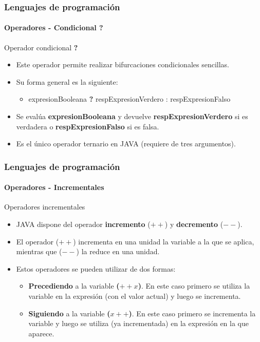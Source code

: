 \documentclass{beamer}
\begin{document}
		\begin{frame}
			\frametitle{Lenguajes de programaci\'on} 
			\framesubtitle{Operadores - Condicional \textbf{?}}

			\begin{block}{Operador condicional \textbf{?}}
				\begin{itemize}
					\item Este operador permite realizar bifurcaciones condicionales sencillas.
					\item Su forma general es la siguiente:
					\begin{itemize}
						\item expresionBooleana \textbf{?} respExpresionVerdero : respExpresionFalso
					\end{itemize}
					\item Se eval\'ua \textbf{expresionBooleana} y devuelve \textbf{respExpresionVerdero} si es verdadera o \textbf{respExpresionFalso} si es falsa.
					\item Es el \'unico operador ternario en JAVA (requiere de tres argumentos).
				\end{itemize}
			\end{block}
		\end{frame}

		\begin{frame}
			\frametitle{Lenguajes de programaci\'on} 
			\framesubtitle{Operadores - Incrementales}

			\begin{block}{Operadores incrementales}
				\begin{itemize}
					\item JAVA dispone del operador \textbf{incremento} ($++$) y \textbf{decremento} ($- -$).
					\item El operador ($++$) incrementa en una unidad la variable a la que se aplica, mientras que ($- -$) la reduce en una unidad.
					\item Estos operadores se pueden utilizar de dos formas:
					\begin{itemize}
						\item \textbf{Precediendo}  a la variable \textbf{($++x$)}. En este caso primero se utiliza la variable en la expresi\'on (con el valor actual) y luego se incrementa.
						\item \textbf{Siguiendo} a la variable \textbf{($x++$)}. En este caso primero se incrementa la variable y luego se utiliza (ya incrementada) en la expresi\'on en la que aparece.
					\end{itemize}
				\end{itemize}
			\end{block}
		\end{frame}
\end{document}

